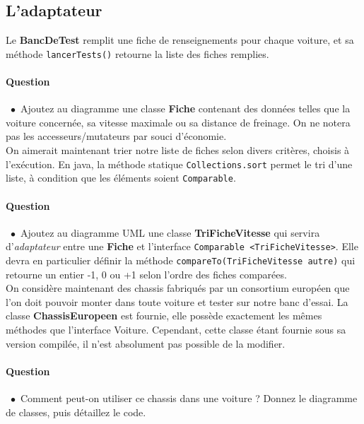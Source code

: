 \documentclass[a4paper,11pt]{exam}
\newcommand{\point}{$\bullet$\ }
\begin{document}
\subsection{L'adaptateur}
Le \textbf{BancDeTest} remplit une fiche de renseignements pour chaque voiture, et sa méthode \texttt{lancerTests()} retourne la liste des fiches remplies.

\paragraph*{\textsf{Question \thequestion}}\ 
\point Ajoutez au diagramme une classe \textbf{Fiche} contenant des données telles que la voiture concernée, sa vitesse maximale ou sa distance de freinage. On ne notera pas les accesseurs/mutateurs par souci d'économie.\\

On aimerait maintenant trier notre liste de fiches selon divers critères, choisis à l'exécution. En java, la méthode statique {\tt Collections.sort} permet le tri d'une liste, à condition que les éléments soient {\tt Comparable}. 

\paragraph*{\textsf{Question \thequestion}}\ 
\point Ajoutez au diagramme UML une classe \textbf{TriFicheVitesse} qui servira d'\emph{adaptateur} entre une \textbf{Fiche} et l'interface {\tt Comparable <TriFicheVitesse>}. Elle devra en particulier définir la méthode {\tt compareTo(TriFicheVitesse autre)} qui retourne un entier -1, 0 ou +1 selon l'ordre des fiches comparées.\\

On considère maintenant des chassis fabriqués par un consortium européen que l'on doit pouvoir monter dans toute voiture et tester sur notre banc d'essai. La classe \textbf{ChassisEuropeen} est fournie, elle possède exactement les mêmes méthodes que l'interface Voiture. Cependant, cette classe étant fournie sous sa version compilée, il n'est absolument pas possible de la modifier.
\paragraph*{\textsf{Question \thequestion}}\
\point Comment peut-on utiliser ce chassis dans une voiture ? Donnez le diagramme de classes, puis détaillez le code.\\

\end{document}
